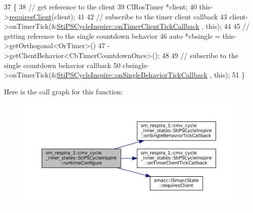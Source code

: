 \begin{DoxyCode}
37   \{
38     \textcolor{comment}{// get reference to the client}
39     ClRosTimer *client;
40     this->\hyperlink{classsmacc_1_1ISmaccState_a7f95c9f0a6ea2d6f18d1aec0519de4ac}{requiresClient}(client);
41 
42     \textcolor{comment}{// subscribe to the timer client callback}
43     client->onTimerTick(&\hyperlink{structsm__respira__1_1_1cmv__cycle__inner__states_1_1StiPSCycleInspire_ae80efcc3db4156c258e3b6cb08e9e1bb}{StiPSCycleInspire::onTimerClientTickCallback}
      , \textcolor{keyword}{this});
44 
45     \textcolor{comment}{// getting reference to the single countdown behavior}
46     \textcolor{keyword}{auto} *cbsingle = this->getOrthogonal<OrTimer>()
47                          ->getClientBehavior<CbTimerCountdownOnce>();
48 
49     \textcolor{comment}{// subscribe to the single countdown behavior callback}
50     cbsingle->onTimerTick(&\hyperlink{structsm__respira__1_1_1cmv__cycle__inner__states_1_1StiPSCycleInspire_a7fca128bf0d16cc63e801542a55fd682}{StiPSCycleInspire::onSingleBehaviorTickCallback}
      , \textcolor{keyword}{this});
51   \}
\end{DoxyCode}
Here is the call graph for this function\+:
\nopagebreak
\begin{figure}[H]
\begin{center}
\leavevmode
\includegraphics[width=350pt]{structsm__respira__1_1_1cmv__cycle__inner__states_1_1StiPSCycleInspire_afa2d2360bb3a678a6c96cf8ffd0564bb_cgraph}
\end{center}
\end{figure}
\mbox{\label{structsm__respira__1_1_1cmv__cycle__inner__states_1_1StiPSCycleInspire_a826ed1f5ccad664dcaf482b2c7a59330}} 
